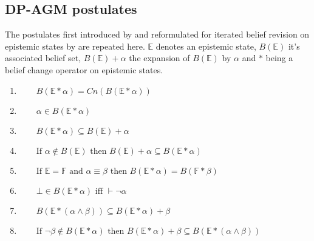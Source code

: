 \documentclass[11pt]{scrartcl}
\theoremstyle{definition}
\begin{document}

\subsection{DP-AGM postulates}
The postulates first introduced by \cite{Alchourron1985} and reformulated for iterated belief revision on epistemic states by \cite{Darwiche1997} are repeated here. $\mathbb{E}$ denotes an epistemic state, $B(\mathbb{E})$ it's associated belief set, $B(\mathbb{E}) + \alpha$ the expansion of $B(\mathbb{E})$ by $\alpha$ and $\ast$ being a belief change operator on epistemic states. 

\begin{enumerate}[wide=0pt, widest=99,leftmargin=\parindent,label = ($\mathbb{E}\!*\!\arabic*$)]
    \item\label{E1} $\qquad B(\mathbb{E}\ast\alpha) = Cn(B(\mathbb{E}\ast\alpha))$
    \item\label{E2} $\qquad \alpha \in B(\mathbb{E}\ast\alpha)$
    \item\label{E3} $\qquad B(\mathbb{E}\ast\alpha)  \subseteq B(\mathbb{E})+\alpha$
    \item\label{E4} $\qquad \textrm{If } \alpha \notin B(\mathbb{E}) \textrm{ then } B(\mathbb{E}) + \alpha \subseteq B(\mathbb{E} \ast \alpha)$
    \item\label{E5} $\qquad \textrm{If } \mathbb{E} = \mathbb{F} \textrm{ and } \alpha \equiv \beta \textrm{ then } B(\mathbb{E} \ast \alpha) = B(\mathbb{F} \ast \beta)$
    \item\label{E6} $\qquad \bot \in B(\mathbb{E} \ast \alpha) \textrm{ iff } \vdash \neg \alpha$
    \item\label{E7} $\qquad B(\mathbb{E} \ast (\alpha \wedge \beta)) \subseteq B(\mathbb{E} \ast \alpha) + \beta$
    \item\label{E8} $\qquad \textrm{If } \neg \beta \notin B(\mathbb{E} \ast \alpha) \textrm{ then } B(\mathbb{E} \ast \alpha) + \beta \subseteq B(\mathbb{E} \ast (\alpha \wedge \beta))$
\end{enumerate}
\end{document}
